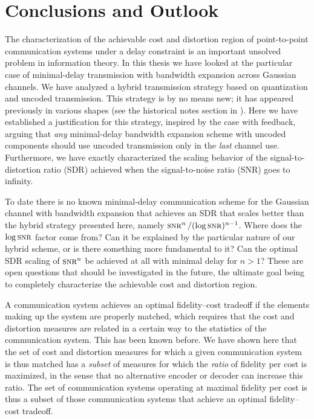 \chapter{Conclusions and Outlook}\label{ch:conclusions}

The characterization of the achievable cost and distortion region of
point-to-point communication systems under a delay constraint is an important
unsolved problem in information theory. In this thesis we have looked at the
particular case of minimal-delay transmission with bandwidth expansion across
Gaussian channels. We have analyzed a hybrid transmission strategy based on
quantization and uncoded transmission. This strategy is by no means new; it has
appeared previously in various shapes (see the historical notes section in
). Here we have established a justification for this
strategy, inspired by the case with feedback, arguing that \emph{any}
minimal-delay bandwidth expansion scheme with uncoded components should use
uncoded transmission only in the \emph{last} channel use. Furthermore, we have
exactly characterized the scaling behavior of the signal-to-distortion ratio
(SDR) achieved when the signal-to-noise ratio (SNR) goes to infinity. 

To date there is no known minimal-delay communication scheme for the Gaussian
channel with bandwidth expansion that achieves an SDR that scales better than
the hybrid strategy presented here, namely $\snr^n / (\log\snr)^{n-1}$. Where
does the $\log\snr$ factor come from? Can it be explained by the particular
nature of our hybrid scheme, or is there something more fundamental to it? Can
the optimal SDR scaling of $\snr^n$ be achieved at all with minimal delay for $n
> 1$? These are open questions that should be investigated in the future, the
ultimate goal being to completely characterize the achievable cost and
distortion region. 

\medbreak

A communication system achieves an optimal fidelity--cost tradeoff if the
elements making up the system are properly matched, which requires that the cost
and distortion measures are related in a certain way to the statistics of the
communication system. This has been known before.  We have shown here that the
set of cost and distortion measures for which a given communication system is
thus matched has a \emph{subset} of measures for which the \emph{ratio} of
fidelity per cost is maximized, in the sense that no alternative encoder or
decoder can increase this ratio. The set of communication systems operating at
maximal fidelity per cost is thus a subset of those communication systems that
achieve an optimal fidelity--cost tradeoff.

